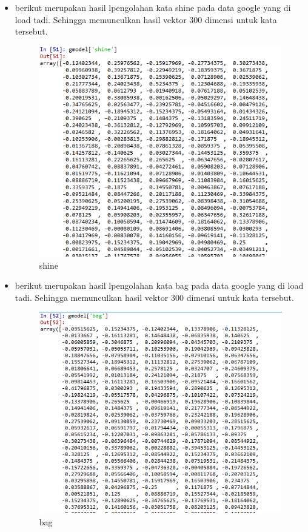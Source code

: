 \begin{enumerate}
\begin{itemize}
				\item berikut merupakan hasil lpengolahan kata shine pada data google yang di load tadi. Sehingga memunculkan hasil vektor 300 dimensi untuk kata tersebut.
	  			\begin{figure}[H]
					\centering
					\includegraphics[scale=0.4]{figures/1174057/chapter5/shine.PNG}
					\caption{shine}
					\label{shine}
				\end{figure}

				\item berikut merupakan hasil lpengolahan kata bag pada data google yang di load tadi. Sehingga memunculkan hasil vektor 300 dimensi untuk kata tersebut.
	  			\begin{figure}[H]
					\centering
					\includegraphics[scale=0.4]{figures/1174057/chapter5/bag.PNG}
					\caption{bag}
					\label{bag}
				\end{figure}


\end{itemize}
\end{enumerate}
